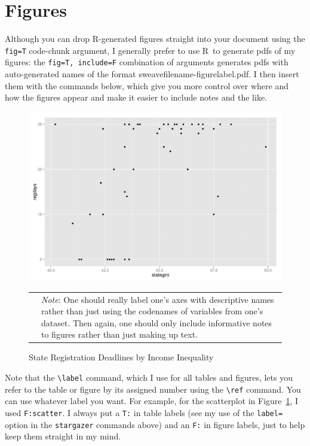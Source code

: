 \documentclass[12pt]{article}
\newcommand{\R}{\textsf{R}~}        %
\begin{document}
\section{Figures}
Although you can drop \textsf{R}-generated figures straight into your document using the \verb+fig=T+ code-chunk argument, I generally prefer to use \R to generate pdfs of my figures: the \verb+fig=T, include=F+ combination of arguments generates pdfs with auto-generated names of the format sweavefilename-figurelabel.pdf.  I then insert them with the commands below, which give you more control over where and how the figures appear and make it easier to include notes and the like.     

 
\begin{figure}[htbp] 
  \caption{State Registration Deadlines by Income Inequality}
  \label{F:scatter}
  \begin{center}
    \includegraphics[width=5.25in]{LaTeX_Example-f1.pdf}
  \end{center}
  \begin{footnotesize}
  \begin{tabular}{p{.4in} p{4.75in}}
  & \emph{Note}: One should really label one's axes with descriptive names rather than just using the codenames of variables from one's dataset.  Then again, one should only include informative notes to figures rather than just making up text.
  \end{tabular}
  \end{footnotesize}
\end{figure}

Note that the \verb+\label+ command, which I use for all tables and figures, lets you refer to the table or figure by its assigned number using the \verb+\ref+ command.  You can use whatever label you want. For example, for the scatterplot in Figure~\ref{F:scatter}, I used \verb+F:scatter+.  I always put a \verb+T:+ in table labels (see my use of the \verb+label=+ option in the \verb+stargazer+ commands above) and an \verb+F:+ in figure labels, just to help keep them straight in my mind. 
\end{document}
